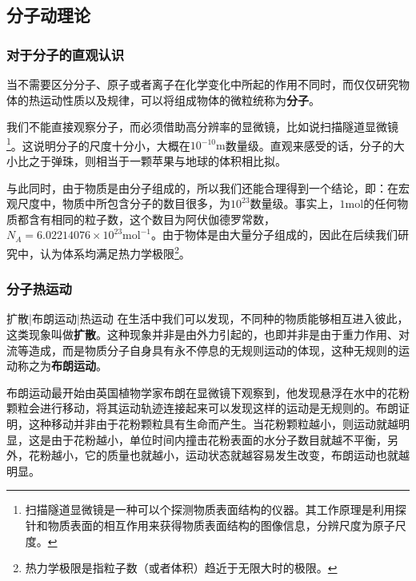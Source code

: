 
\begin{issues}
\issueTODO
\end{issues}

\subsection{分子动理论}
\subsubsection{对于分子的直观认识}
当不需要区分分子、原子或者离子在化学变化中所起的作用不同时，而仅仅研究物体的热运动性质以及规律，可以将组成物体的微粒统称为\textbf{分子}。

我们不能直接观察分子，而必须借助高分辨率的显微镜，比如说扫描隧道显微镜\footnote{扫描隧道显微镜是一种可以个探测物质表面结构的仪器。其工作原理是利用探针和物质表面的相互作用来获得物质表面结构的图像信息，分辨尺度为原子尺度。}。这说明分子的尺度十分小，大概在$10^{-10}\mathrm{m}$数量级。直观来感受的话，分子的大小比之于弹珠，则相当于一颗苹果与地球的体积相比拟。

与此同时，由于物质是由分子组成的，所以我们还能合理得到一个结论，即：在宏观尺度中，物质中所包含分子的数目很多，为$10^{23}$数量级。事实上，$1\mathrm{mol}$的任何物质都含有相同的粒子数，这个数目为阿伏伽德罗常数，$N_A=6.02214076\times 10^{23}\mathrm{mol^{-1}}$。由于物体是由大量分子组成的，因此在后续我们研究中，认为体系均满足热力学极限\footnote{热力学极限是指粒子数（或者体积）趋近于无限大时的极限。}。
\subsubsection{分子热运动}
扩散|布朗运动|热运动
在生活中我们可以发现，不同种的物质能够相互进入彼此，这类现象叫做\textbf{扩散}。这种现象并非是由外力引起的，也即并非是由于重力作用、对流等造成，而是物质分子自身具有永不停息的无规则运动的体现，这种无规则的运动称之为\textbf{布朗运动}。

布朗运动最开始由英国植物学家布朗在显微镜下观察到，他发现悬浮在水中的花粉颗粒会进行移动，将其运动轨迹连接起来可以发现这样的运动是无规则的。布朗证明，这种移动并非由于花粉颗粒具有生命而产生。当花粉颗粒越小，则运动就越明显，这是由于花粉越小，单位时间内撞击花粉表面的水分子数目就越不平衡，另外，花粉越小，它的质量也就越小，运动状态就越容易发生改变，布朗运动也就越明显。

